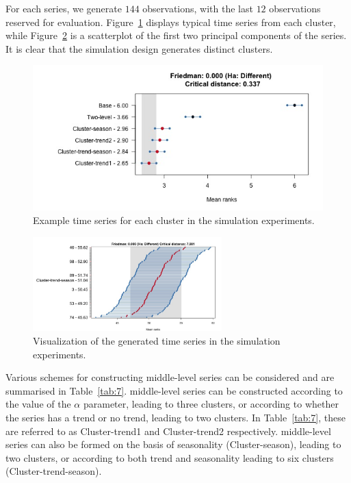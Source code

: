 \documentclass[a4paper,review,12pt,authoryear]{elsarticle}
\begin{document}
For each series, we generate $144$ observations, with the last $12$ observations reserved for evaluation. Figure~\ref{fig:simu_emps} displays typical time series from each cluster, while Figure~\ref{fig:simu_pca} is a scatterplot of the first two principal components of the series. It is clear that the simulation design generates distinct clusters.

\begin{figure}[!h]
\centering
\includegraphics[width=\textwidth]{../figures/Figure10.jpg}
\caption{\label{fig:simu_emps}Example time series for each cluster in the simulation experiments.}
\end{figure}

\begin{figure}[!h]
    \centering
    \includegraphics[width=0.65\textwidth]{../figures/Figure11.jpg}
    \caption{\label{fig:simu_pca}Visualization of the generated time series in the simulation experiments.}
\end{figure}






Various schemes for constructing middle-level series can be considered and are summarised in Table~\ref{tab:7}. middle-level series can be constructed according to the value of the $\alpha$ parameter, leading to three clusters, or according to whether the series has a trend or no trend, leading to two clusters. In Table~\ref{tab:7}, these are referred to as Cluster-trend1 and Cluster-trend2 respectively. middle-level series can also be formed on the basis of seasonality (Cluster-season), leading to two clusters, or according to both trend and seasonality leading to six clusters (Cluster-trend-season).
\end{document}
